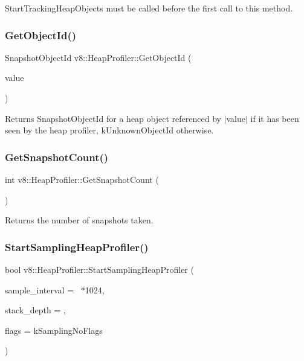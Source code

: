 Start\+Tracking\+Heap\+Objects must be called before the first call to this method. \mbox{\label{classv8_1_1HeapProfiler_ab926a1f1ed95b731d4ef3133e67eef19}} 
\subsubsection{\texorpdfstring{Get\+Object\+Id()}{GetObjectId()}}
{\footnotesize\ttfamily Snapshot\+Object\+Id v8\+::\+Heap\+Profiler\+::\+Get\+Object\+Id (\begin{DoxyParamCaption}\item[{\mbox{\hyperlink{classv8_1_1Local}{Local}}$<$ \mbox{\hyperlink{classv8_1_1Value}{Value}} $>$}]{value }\end{DoxyParamCaption})}

Returns Snapshot\+Object\+Id for a heap object referenced by $\vert$value$\vert$ if it has been seen by the heap profiler, k\+Unknown\+Object\+Id otherwise. \mbox{\label{classv8_1_1HeapProfiler_a24830775a0ab938eb0a29ed8f3dfd265}} 
\subsubsection{\texorpdfstring{Get\+Snapshot\+Count()}{GetSnapshotCount()}}
{\footnotesize\ttfamily int v8\+::\+Heap\+Profiler\+::\+Get\+Snapshot\+Count (\begin{DoxyParamCaption}{ }\end{DoxyParamCaption})}

Returns the number of snapshots taken. \mbox{\label{classv8_1_1HeapProfiler_a6b9450bbf1f4e1a4909df92d4df4a174}} 
\subsubsection{\texorpdfstring{Start\+Sampling\+Heap\+Profiler()}{StartSamplingHeapProfiler()}}
{\footnotesize\ttfamily bool v8\+::\+Heap\+Profiler\+::\+Start\+Sampling\+Heap\+Profiler (\begin{DoxyParamCaption}\item[{uint64\+\_\+t}]{sample\+\_\+interval = {~$\ast$1024},  }\item[{int}]{stack\+\_\+depth = {},  }\item[{Sampling\+Flags}]{flags = {\ttfamily kSamplingNoFlags} }\end{DoxyParamCaption})}

